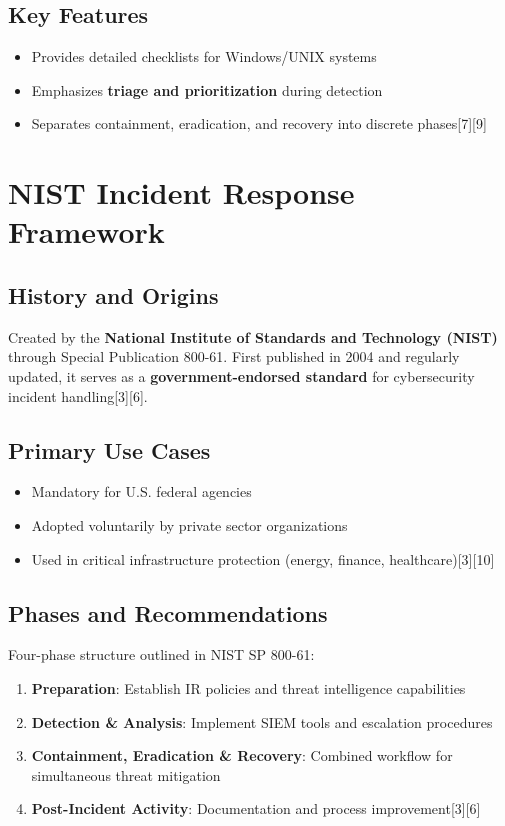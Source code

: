\documentclass[11pt]{book}
\begin{document}
\section{Key Features}
\begin{itemize}
    \item Provides detailed checklists for Windows/UNIX systems
    \item Emphasizes \textbf{triage and prioritization} during detection
    \item Separates containment, eradication, and recovery into discrete phases[7][9]
\end{itemize}

\chapter{NIST Incident Response Framework}

\section{History and Origins}
Created by the \textbf{National Institute of Standards and Technology (NIST)} through Special Publication 800-61. First published in 2004 and regularly updated, it serves as a \textbf{government-endorsed standard} for cybersecurity incident handling[3][6].

\section{Primary Use Cases}
\begin{itemize}
    \item Mandatory for U.S. federal agencies
    \item Adopted voluntarily by private sector organizations
    \item Used in critical infrastructure protection (energy, finance, healthcare)[3][10]
\end{itemize}

\section{Phases and Recommendations}
Four-phase structure outlined in NIST SP 800-61:
\begin{enumerate}
    \item \textbf{Preparation}: Establish IR policies and threat intelligence capabilities
    \item \textbf{Detection \& Analysis}: Implement SIEM tools and escalation procedures
    \item \textbf{Containment, Eradication \& Recovery}: Combined workflow for simultaneous threat mitigation
    \item \textbf{Post-Incident Activity}: Documentation and process improvement[3][6]
\end{enumerate}
\end{document}
